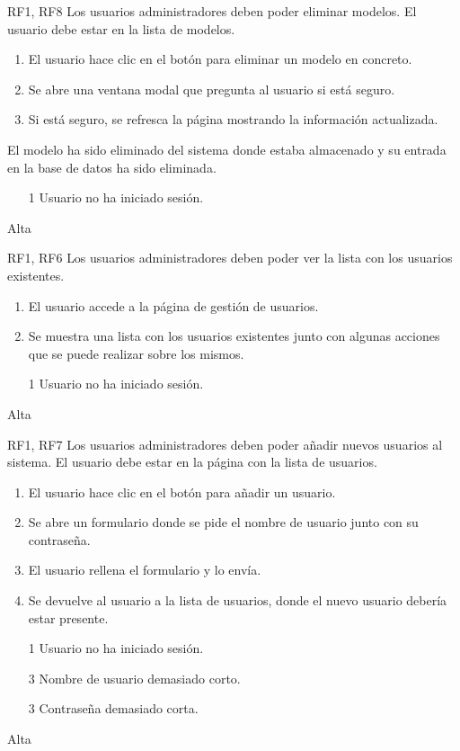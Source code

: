 {RF1, RF8}
{Los usuarios administradores deben poder eliminar modelos.}
{El usuario debe estar en la lista de modelos.}
{
    \begin{enumerate}
        \def\labelenumi{\arabic{enumi}.}
        \tightlist
        \item El usuario hace clic en el botón para eliminar un modelo en concreto.
        \item Se abre una ventana modal que pregunta al usuario si está seguro.
        \item Si está seguro, se refresca la página mostrando la información actualizada.
    \end{enumerate}
}
{
    El modelo ha sido eliminado del sistema donde estaba almacenado y su entrada en
    la base de datos ha sido eliminada.
}
{
    \begin{itemize}
        \item [1] Usuario no ha iniciado sesión.
    \end{itemize}
}
{Alta}

{RF1, RF6}
{Los usuarios administradores deben poder ver la lista con los usuarios existentes.}
{}
{
    \begin{enumerate}
        \def\labelenumi{\arabic{enumi}.}
        \tightlist
        \item El usuario accede a la página de gestión de usuarios.
        \item Se muestra una lista con los usuarios existentes junto con algunas acciones que se puede realizar sobre los mismos.
    \end{enumerate}
}
{}
{
    \begin{itemize}
        \item [1] Usuario no ha iniciado sesión.
    \end{itemize}
}
{Alta}

{RF1, RF7}
{Los usuarios administradores deben poder añadir nuevos usuarios al sistema.}
{El usuario debe estar en la página con la lista de usuarios.}
{
    \begin{enumerate}
        \def\labelenumi{\arabic{enumi}.}
        \tightlist
        \item El usuario hace clic en el botón para añadir un usuario.
        \item Se abre un formulario donde se pide el nombre de usuario junto con
        su contraseña.
        \item El usuario rellena el formulario y lo envía.
        \item Se devuelve al usuario a la lista de usuarios, donde el nuevo
              usuario debería estar presente.
    \end{enumerate}
}
{}
{
    \begin{itemize}
        \item [1] Usuario no ha iniciado sesión.
        \item [3] Nombre de usuario demasiado corto.
        \item [3] Contraseña demasiado corta.
    \end{itemize}
}
{Alta}

